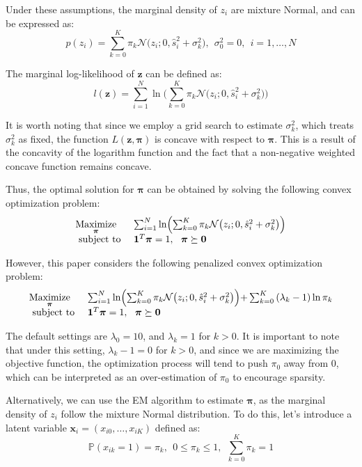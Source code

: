 \documentclass[11pt]{article}
\begin{document}
Under these assumptions, the marginal density of $z_i$ are mixture Normal, and can be expressed as:
$$
p(z_i)  = \sum_{k=0}^K \pi_k \mathcal{N} \bigl(z_i; 0, \hat{s}_i^2+\sigma_k^2 \bigl), \ \ \sigma_0^2 = 0, \ \ i = 1, \ldots, N
$$

The marginal log-likelihood of $\boldsymbol{z}$ can be defined as:
$$
l(\boldsymbol{z}) =  \sum_{i=1}^N  \ln \Biggl( \sum_{k=0}^K \pi_k \mathcal{N} \bigl(z_i; 0, \hat{s}_i^2+\sigma_k^2 \bigl) \Biggl)
$$


It is worth noting that since we employ a grid search to estimate $\sigma_k^2$, which treats $\sigma_k^2$ as fixed, the function $L(\boldsymbol{z}, \boldsymbol{\pi})$ is concave with respect to $\boldsymbol{\pi}$. This is a result of the concavity of the logarithm function and the fact that a non-negative weighted concave function remains concave.

Thus, the optimal solution for $\boldsymbol{\pi}$ can be obtained by solving the following convex optimization problem:
$$
\begin{array}{ll}
\underset{\boldsymbol{\pi}}{\operatorname{Maximize}} &  \sum_{i=1}^N  \ln \Bigl( \sum_{k=0}^K \pi_k \mathcal{N} \bigl(z_i; 0, \hat{s}_i^2+\sigma_k^2 \bigl) \Bigl)  \\
\text { subject to } &  \mathbf{1}^T \boldsymbol{\pi} = 1, \ \  \boldsymbol{\pi} \succeq \mathbf{0}
\end{array}
$$

However, this paper considers the following penalized convex optimization problem:
$$
\begin{array}{ll}
\underset{\boldsymbol{\pi}}{\operatorname{Maximize}} &  \sum_{i=1}^N  \ln \Bigl( \sum_{k=0}^K \pi_k \mathcal{N} \bigl(z_i; 0, \hat{s}_i^2+\sigma_k^2 \bigl) \Bigl) + \sum_{k=0}^K\left(\lambda_k-1\right) \ln \pi_k \\
\text { subject to } &  \mathbf{1}^T \boldsymbol{\pi} = 1, \ \  \boldsymbol{\pi} \succeq \mathbf{0}
\end{array}
$$

The default settings are $\lambda_0 = 10$, and $\lambda_k = 1$ for $k > 0$. It is important to note that under this setting, $\lambda_k - 1 = 0$ for $k>0$, and since we are maximizing the objective function, the optimization process will tend to push $\pi_0$ away from 0, which can be interpreted as an over-estimation of $\pi_0$ to encourage sparsity.

Alternatively, we can use the EM algorithm to estimate $\boldsymbol{\pi}$, as the marginal density of $z_i$ follow the mixture Normal distribution. To do this, let's introduce a latent variable $\boldsymbol{x}_i = (x_{i0}, \ldots, x_{iK})$ defined as:
$$
\mathbb{P}(x_{ik} = 1) = \pi_k, \ \ 0 \leqslant \pi_k \leqslant 1, \ \ \sum_{k=0}^K \pi_k = 1
$$
\end{document}
